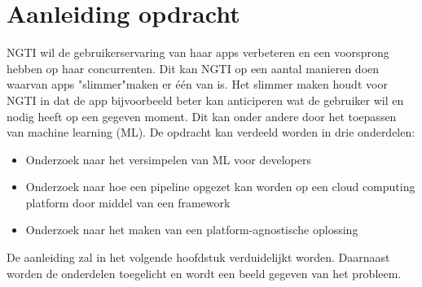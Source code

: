 \section{Aanleiding opdracht}\label{sec:ch1-aanleiding-opdracht}
NGTI wil de gebruikerservaring van haar apps verbeteren en een voorsprong hebben op haar concurrenten. Dit kan NGTI op een aantal manieren doen waarvan apps "slimmer"\space maken er één van is. Het slimmer maken houdt voor NGTI in dat de app bijvoorbeeld beter kan anticiperen wat de gebruiker wil en nodig heeft op een gegeven moment. Dit kan onder andere door het toepassen van machine learning (ML). De opdracht kan verdeeld worden in drie onderdelen:

\begin{itemize}
  \item Onderzoek naar het versimpelen van ML voor developers
  \item Onderzoek naar hoe een pipeline opgezet kan worden op een cloud computing platform door middel van een framework
  \item Onderzoek naar het maken van een platform-agnostische oplossing
\end{itemize}

De aanleiding zal in het volgende hoofdstuk verduidelijkt worden. Daarnaast worden de onderdelen toegelicht en wordt een beeld gegeven van het probleem.

